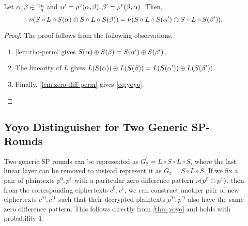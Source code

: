 \documentclass[twoside]{article}
\begin{document}
\begin{theorem}
    \label{thm:yoyo}
    Let \(\alpha, \beta \in \mathbb F_q^n\) and \(\alpha^\prime = \rho^v(\alpha,
    \beta), \beta^\prime = \rho^v(\beta, \alpha)\). Then,
    \begin{equation}
        \nu(S \circ L \circ S(\alpha) \oplus S \circ L \circ S(\beta)) = \nu(S \circ L \circ S(\alpha^\prime) \oplus S \circ L \circ S(\beta^\prime)).
        \label{eq:yoyo}
    \end{equation}
\end{theorem}
\begin{proof}
    The proof follows from the following observations.
    \begin{enumerate}
        \item \autoref{lem:rho-perm} gives \(S(\alpha) \oplus S(\beta)
        = S(\alpha^\prime) \oplus S(\beta^\prime)\).
        \item The linearity of \(L\) gives \(L(S(\alpha)) \oplus
        L(S(\beta)) = L(S(\alpha^\prime)) \oplus
        L(S(\beta^\prime))\).
        \item Finally, \autoref{lem:zero-diff-perm} gives \eqref{eq:yoyo}.
    \end{enumerate} 
\end{proof}

\subsection{Yoyo Distinguisher for Two Generic SP-Rounds}

Two generic SP rounds can be represented as \(G_2^\prime = L \circ S \circ L
\circ S\), where the last linear layer can be removed to instead represent it as
\(G_2 = S \circ L \circ S\). If we fix a pair of plaintexts \(p^0, p^1\) with a
paritcular zero difference pattern \(\nu(p^0 \oplus p^1)\), then from the
corresponding ciphertexts \(c^0, c^1\), we can construct another pair of new
ciphertexts \(c^{\prime 0}, c^{\prime 1}\) such that their decrypted plaintexts
\(p^{\prime 0}, p^{\prime 1}\) also have the same zero difference pattern. This
follows directly from \autoref{thm:yoyo} and holds with probability 1.
\end{document}
